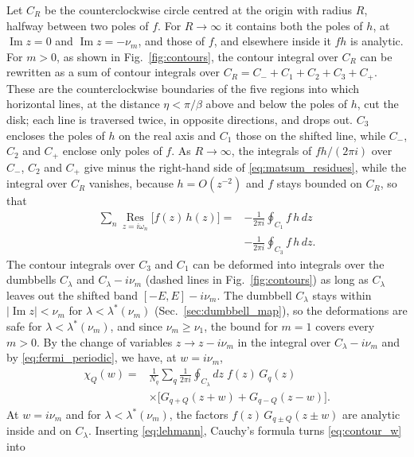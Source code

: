 \documentclass[aps,prb,reprint,a4paper]{revtex4-2}
\newcommand{\Res}{\operatorname*{Res}}
\DeclareMathOperator{\Imag}{Im}
\begin{document}
Let $C_R$ be the counterclockwise circle centred at the origin with radius $R$, halfway between two poles of $f$. For $R\to\infty$ it contains both the poles of $h$, at $\Imag z=0$ and $\Imag z=-\nu_m$, and those of $f$, and elsewhere inside it $fh$ is analytic. For $m>0$, as shown in Fig.~\ref{fig:contours}, the contour integral over $C_R$ can be rewritten as a sum of contour integrals over $C_R=C_-+C_1+C_2+C_3+C_+$. These are the counterclockwise boundaries of the five regions into which horizontal lines, at the distance $\eta<\pi/\beta$ above and below the poles of $h$, cut the disk; each line is traversed twice, in opposite directions, and drops out. $C_3$ encloses the poles of $h$ on the real axis and $C_1$ those on the shifted line, while $C_-$, $C_2$ and $C_+$ enclose only poles of $f$. As $R\to\infty$, the integrals of $fh/(2\pi i)$ over $C_-$, $C_2$ and $C_+$ give minus the right-hand side of \eqref{eq:matsum_residues}, while the integral over $C_R$ vanishes, because $h=O(z^{-2})$ and $f$ stays bounded on $C_R$, so that
\begin{equation}
  \begin{aligned}
  \sum_n\Res_{z=i\omega_n}\big[f(z)\,h(z)\big]={}&-\frac1{2\pi i}\oint_{C_1}f\,h\,dz\\
  &-\frac1{2\pi i}\oint_{C_3}f\,h\,dz .
  \end{aligned}
  \label{eq:residues_cuts}
\end{equation}
The contour integrals over $C_3$ and $C_1$ can be deformed into integrals over the dumbbells $C_\lambda$ and $C_\lambda-i\nu_m$ (dashed lines in Fig.~\ref{fig:contours}) as long as $C_\lambda$ leaves out the shifted band $[-E,E]-i\nu_m$. The dumbbell $C_\lambda$ stays within $\lvert\Imag z\rvert<\nu_m$ for $\lambda<\lambda^*(\nu_m)$ (Sec.~\ref{sec:dumbbell_map}), so the deformations are safe for $\lambda<\lambda^*(\nu_m)$, and since $\nu_m\ge\nu_1$, the bound for $m=1$ covers every $m>0$. By the change of variables $z\to z-i\nu_m$ in the integral over $C_\lambda-i\nu_m$ and by \eqref{eq:fermi_periodic}, we have, at $w=i\nu_m$,
\begin{equation}
  \begin{aligned}
  \chi_Q(w)={}&\frac1{N_q}\sum_q\frac1{2\pi i}\oint_{C_\lambda}dz\;f(z)\,G_q(z)\\
  &\times\Big[G_{q+Q}(z+w)+G_{q-Q}(z-w)\Big].
  \end{aligned}
  \label{eq:contour_w}
\end{equation}
At $w=i\nu_m$ and for $\lambda<\lambda^*(\nu_m)$, the factors $f(z)\,G_{q\pm Q}(z\pm w)$ are analytic inside and on $C_\lambda$. Inserting \eqref{eq:lehmann}, Cauchy's formula turns \eqref{eq:contour_w} into
\end{document}

